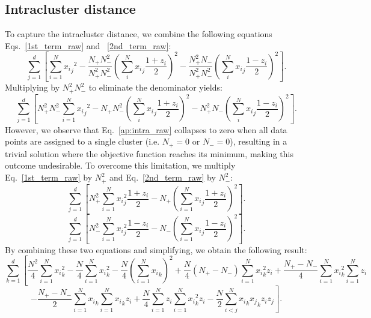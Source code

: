 \documentclass[showpacs,twocolumn,superscriptaddress]{revtex4-2}
\begin{document}
\subsection{Intracluster distance}
\label{sec:Appendix_A1}
To capture the intracluster distance, we combine the following equations Eqs.~\eqref{1st_term_raw} and ~\eqref{2nd_term_raw}:
\begin{equation}\label{ap:denominator}
    \sum_{j=1}^d \left[\sum_{i=1}^{N} {{x_i}_j}^2 - \frac{N_+N_-^2}{N_+^2N_-^2}\left(\sum_i^N {x_i}_j\frac{1+z_i}{2}\right)^2 - \frac{N_+^2N_-}{N_+^2N_-^2}\left(\sum_i^N {x_i}_j\frac{1-z_i}{2}\right)^2 \right].
\end{equation}
Multiplying by $N_+^2N_-^2$ to eliminate the denominator yields:
\begin{equation}\label{ap:intra_raw}
    \sum_{j=1}^d \left[N_{+}^2N_{-}^2\sum_{i=1}^{N} {{x_i}_j}^2 - N_{+}N_{-}^2\left(\sum_i^N {{x_i}_j}\frac{1+z_i}{2}\right)^2  - N_{+}^2N_{-}\left(\sum_i^N {{x_i}_j}\frac{1-z_i}{2}\right)^2 \right].
\end{equation}
However, we observe that Eq.~\eqref{ap:intra_raw} collapses to zero when all data points are assigned to a single cluster (i.e. $N_+=0$ or $N_-=0$), resulting in a trivial solution where the objective function reaches its minimum, making this outcome undesirable.
To overcome this limitation, we multiply Eq.~\eqref{1st_term_raw} by $N_+^2$ and Eq.~\eqref{2nd_term_raw} by $N_-^2$:
\begin{equation}
    \sum_{j=1}^d \left[N_+^2 \sum_{i=1}^N {x_i}_j^2 \frac{1+z_i}{2} - N_+ \left(\sum_{i=1}^N {x_i}_j \frac{1+z_i}{2}\right)^2\right].
\end{equation}
\begin{equation}
    \sum_{j=1}^d \left[N_-^2 \sum_{i=1}^N {x_i}_j^2 \frac{1-z_i}{2} - N_- \left(\sum_{i=1}^N {x_i}_j \frac{1-z_i}{2}\right)^2\right].
\end{equation}
By combining these two equations and simplifying, we obtain the following result:
\begin{equation}
    \sum_{k=1}^d \left[\frac{N^2}{4}\sum_{i=1}^N {x_i}_k^2 - \frac{N}{4}\sum_{i=1}^N {x_i}_k^2 - \frac{N}{4}\left(\sum_{i=1}^N {x_i}_k \right)^2 + \frac{N}{4}\left(N_{+}-N_{-}\right)\sum_{i=1}^N{x_i}_k^2z_i + \frac{N_{+}-N_{-}}{4}\sum_{i=1}^N{x_i}_k^2\sum_{i=1}^Nz_i \right.\nonumber
\end{equation}
\begin{equation}
    \left.- \frac{N_{+}-N_{-}}{2}\sum_{i=1}^N{x_i}_k\sum_{i=1}^N{x_i}_k z_i + \frac{N}{4}\sum_{i=1}^N z_i \sum_{i=1}^N{x_i}_k^2z_i - \frac{N}{2}\sum_{i<j}^N {x_i}_k {x_j}_k z_iz_j \right].
\end{equation}
\end{document}
